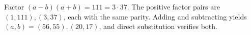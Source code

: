 Factor $(a-b)(a+b)=111=3\cdot37$. The positive factor pairs are $(1,111),(3,37)$, each with the same parity. Adding and subtracting yields $\boxed{(a,b)=(56,55),(20,17)}$, and direct substitution verifies both.
